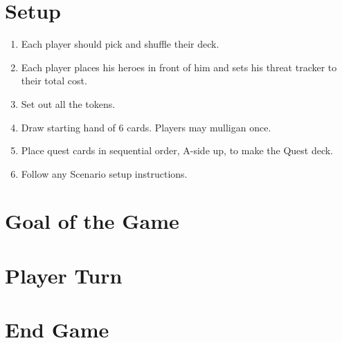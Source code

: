 \documentclass[12pt]{article}
\newenvironment{enumerateCustom}
{\begin{enumerate}
  \setlength{\itemsep}{1pt}
  \setlength{\parskip}{0pt}
  \setlength{\parsep}{0pt}}
{\end{enumerate}}
\begin{document}
\begin{mdframed}[style = customFrame]
\begin{multicols*}{2}

\section*{Setup}
\begin{enumerateCustom}
	\item Each player should pick and shuffle their deck.
	\item Each player places his heroes in front of him and sets his threat tracker to their total cost.
	\item Set out all the tokens.
	\item Draw starting hand of 6 cards. Players may mulligan once.
	\item Place quest cards in sequential order, A-side up, to make the Quest deck.
	\item Follow any Scenario setup instructions.
\end{enumerateCustom}

\section*{Goal of the Game}
\section*{Player Turn}
\section*{End Game}

\end{multicols*}
\end{mdframed}
\end{document}

